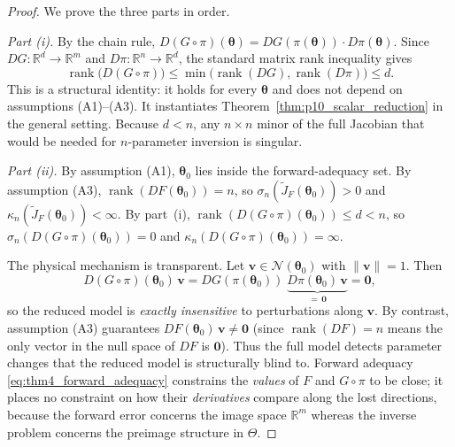 \begin{proof}
We prove the three parts in order.

\medskip
\noindent\textit{Part (i).}\;
By the chain rule, $D(G\circ\pi)(\boldsymbol{\theta})
= DG(\pi(\boldsymbol{\theta}))\cdot D\pi(\boldsymbol{\theta})$.
Since $DG:\mathbb{R}^d\to\mathbb{R}^m$ and $D\pi:\mathbb{R}^n\to\mathbb{R}^d$,
the standard matrix rank inequality gives
\begin{equation}
  \operatorname{rank}\bigl(D(G\circ\pi)\bigr)
  \leq
  \min\!\bigl(\operatorname{rank}(DG),\operatorname{rank}(D\pi)\bigr)
  \leq d.
\end{equation}
This is a structural identity: it holds for every $\boldsymbol{\theta}$ and
does not depend on assumptions (A1)--(A3).  It instantiates
Theorem~\ref{thm:p10_scalar_reduction} in the general setting.  Because
$d<n$, any $n\times n$ minor of the full Jacobian that would be needed for
$n$-parameter inversion is singular.

\medskip
\noindent\textit{Part (ii).}\;
By assumption (A1), $\boldsymbol{\theta}_0$ lies inside the forward-adequacy
set.  By assumption (A3), $\operatorname{rank}(DF(\boldsymbol{\theta}_0))=n$,
so $\sigma_n(\widetilde{J}_F(\boldsymbol{\theta}_0))>0$ and
$\kappa_n(\widetilde{J}_F(\boldsymbol{\theta}_0))<\infty$.  By part~(i),
$\operatorname{rank}(D(G\circ\pi)(\boldsymbol{\theta}_0))\leq d<n$, so
$\sigma_n(D(G\circ\pi)(\boldsymbol{\theta}_0))=0$ and
$\kappa_n(D(G\circ\pi)(\boldsymbol{\theta}_0))=\infty$.

The physical mechanism is transparent.  Let
$\mathbf{v}\in\mathcal{N}(\boldsymbol{\theta}_0)$ with $\|\mathbf{v}\|=1$.
Then
\begin{equation}
  D(G\circ\pi)(\boldsymbol{\theta}_0)\,\mathbf{v}
  =
  DG(\pi(\boldsymbol{\theta}_0))\;\underbrace{D\pi(\boldsymbol{\theta}_0)\,\mathbf{v}}_{=\,\mathbf{0}}
  =
  \mathbf{0},
  \label{eq:thm4_null_mechanism}
\end{equation}
so the reduced model is \emph{exactly insensitive} to perturbations along
$\mathbf{v}$.  By contrast, assumption (A3) guarantees
$DF(\boldsymbol{\theta}_0)\,\mathbf{v}\neq\mathbf{0}$ (since
$\operatorname{rank}(DF)=n$ means the only vector in the null space of $DF$ is
$\mathbf{0}$).  Thus the full model detects parameter changes that the reduced
model is structurally blind to.  Forward adequacy
\eqref{eq:thm4_forward_adequacy} constrains the \emph{values} of $F$ and
$G\circ\pi$ to be close; it places no constraint on how their
\emph{derivatives} compare along the lost directions, because the forward
error concerns the image space $\mathbb{R}^m$ whereas the inverse problem
concerns the preimage structure in $\Theta$.


\end{proof}

